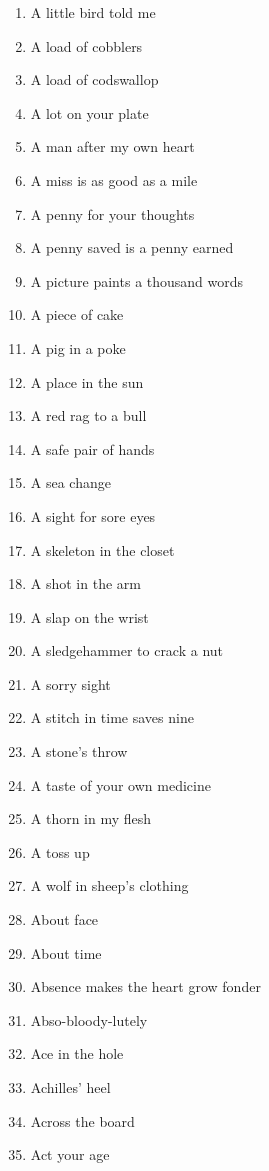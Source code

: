 \begin{enumerate}
        \item  A little bird told me
        \item  A load of cobblers
        \item  A load of codswallop
        \item  A lot on your plate
        \item  A man after my own heart
        \item  A miss is as good as a mile
        \item  A penny for your thoughts
        \item  A penny saved is a penny earned
        \item  A picture paints a thousand words
        \item  A piece of cake
        \item  A pig in a poke
        \item  A place in the sun
        \item  A red rag to a bull
        \item  A safe pair of hands
        \item  A sea change
        \item  A sight for sore eyes
        \item  A skeleton in the closet
        \item  A shot in the arm
        \item  A slap on the wrist
        \item  A sledgehammer to crack a nut
        \item  A sorry sight
        \item  A stitch in time saves nine
        \item  A stone's throw
        \item  A taste of your own medicine
        \item  A thorn in my flesh
        \item  A toss up
        \item  A wolf in sheep's clothing
        \item  About face
        \item  About time
        \item  Absence makes the heart grow fonder
        \item  Abso-bloody-lutely
        \item  Ace in the hole
        \item  Achilles' heel
        \item  Across the board
        \item  Act your age

\end{enumerate}
